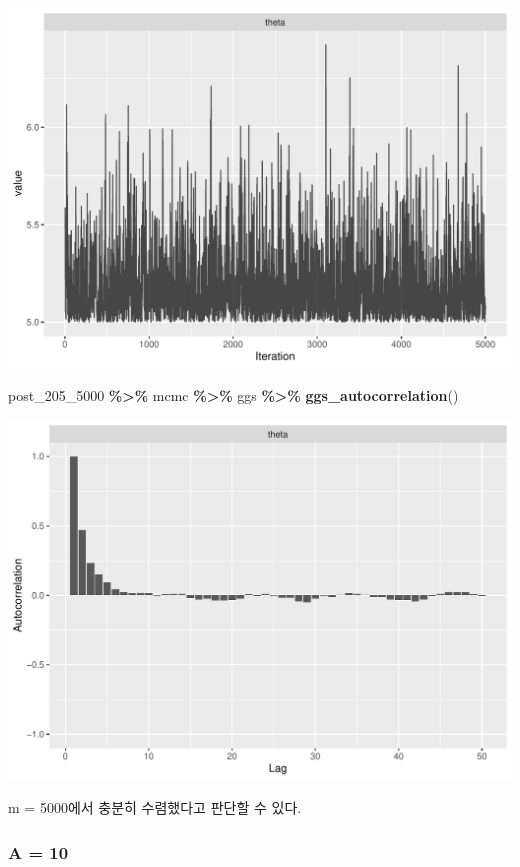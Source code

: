\documentclass[
]{article}
\newenvironment{Shaded}{\begin{snugshade}}{\end{snugshade}}
\newcommand{\FunctionTok}[1]{\textcolor[rgb]{0.13,0.29,0.53}{\textbf{#1}}}
\newcommand{\NormalTok}[1]{#1}
\newcommand{\SpecialCharTok}[1]{\textcolor[rgb]{0.81,0.36,0.00}{\textbf{#1}}}
\begin{document}
\begin{center}\includegraphics[width=0.8\linewidth]{Bayes_stat_hw3_files/figure-latex/unnamed-chunk-36-2} \end{center}

\begin{Shaded}
\begin{Highlighting}[]
\NormalTok{post\_205\_5000 }\SpecialCharTok{\%\textgreater{}\%}\NormalTok{ mcmc }\SpecialCharTok{\%\textgreater{}\%}\NormalTok{ ggs }\SpecialCharTok{\%\textgreater{}\%} \FunctionTok{ggs\_autocorrelation}\NormalTok{()}
\end{Highlighting}
\end{Shaded}

\begin{center}\includegraphics[width=0.8\linewidth]{Bayes_stat_hw3_files/figure-latex/unnamed-chunk-36-3} \end{center}

m = 5000에서 충분히 수렴했다고 판단할 수 있다.

\subsubsection{A = 10}\label{a-10}
\end{document}
